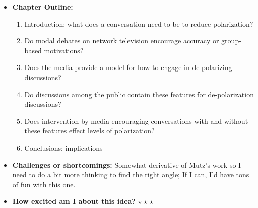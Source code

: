 \documentclass[12pt]{article}
\begin{document}
\begin{itemize}
        \item \textbf{Chapter Outline:}
        \begin{enumerate}
            \item Introduction; what does a conversation need to be to reduce polarization?
            \item Do modal debates on network television encourage accuracy or group-based motivations?
            \item Does the media provide a model for how to engage in de-polarizing discussions?
            \item Do discussions among the public contain these features for de-polarization discussions?
            \item Does intervention by media encouraging conversations with and without these features effect levels of polarization?
            \item Conclusions; implications
        \end{enumerate}
        \item \textbf{Challenges or shortcomings:} Somewhat derivative of Mutz's work so I need to do a bit more thinking to find the right angle; If I can, I'd have tons of fun with this one.
        \item \textbf{How excited am I about this idea?} $\star$ $\star$ $\star$
    \end{itemize}
\end{document}

